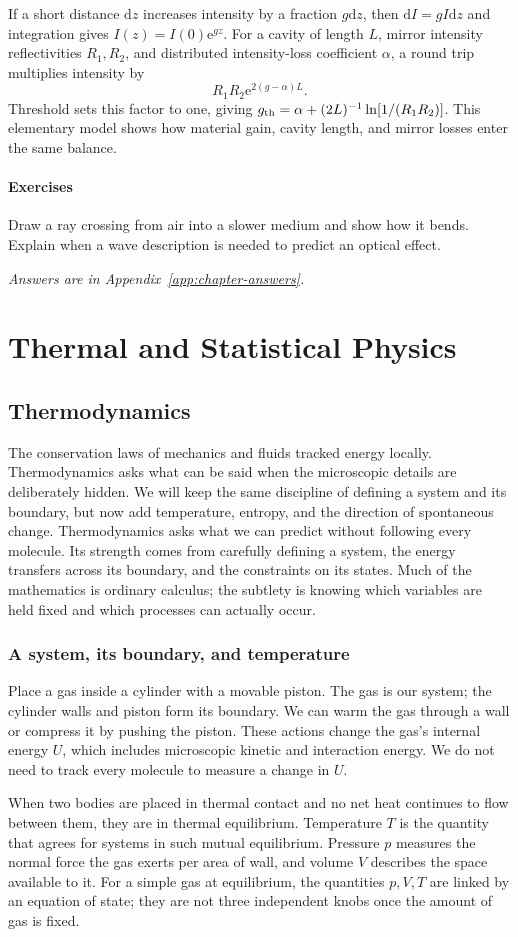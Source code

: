 \documentclass[11pt,oneside]{book}
\newcommand{\dd}{\mathrm{d}}
\newcommand{\ee}{\mathrm{e}}
\theoremstyle{reviewstyle}
\newcommand{\learningcheck}[1]{\subsection*{Exercises}\noindent #1\par\smallskip\noindent\emph{Answers are in Appendix~\ref{app:chapter-answers}.}}
\begin{document}
If a short distance $\dd z$ increases intensity by a fraction $g\dd z$, then $\dd I=gI\dd z$ and integration gives $I(z)=I(0)\ee^{gz}$. For a cavity of length $L$, mirror intensity reflectivities $R_1,R_2$, and distributed intensity-loss coefficient $\alpha$, a round trip multiplies intensity by
\begin{equation}
R_1R_2\ee^{2(g-\alpha)L}.
\end{equation}
Threshold sets this factor to one, giving $g_{\rm th}=\alpha+(2L)^{-1}\ln[1/(R_1R_2)]$. This elementary model shows how material gain, cavity length, and mirror losses enter the same balance.

\learningcheck{Draw a ray crossing from air into a slower medium and show how it bends. Explain when a wave description is needed to predict an optical effect.}

\part{Thermal and Statistical Physics}
\chapter{Thermodynamics}
The conservation laws of mechanics and fluids tracked energy locally. Thermodynamics asks what can be said when the microscopic details are deliberately hidden. We will keep the same discipline of defining a system and its boundary, but now add temperature, entropy, and the direction of spontaneous change.
Thermodynamics asks what we can predict without following every molecule. Its strength comes from carefully defining a system, the energy transfers across its boundary, and the constraints on its states. Much of the mathematics is ordinary calculus; the subtlety is knowing which variables are held fixed and which processes can actually occur.

\section{A system, its boundary, and temperature}
Place a gas inside a cylinder with a movable piston. The gas is our system; the cylinder walls and piston form its boundary. We can warm the gas through a wall or compress it by pushing the piston. These actions change the gas's internal energy $U$, which includes microscopic kinetic and interaction energy. We do not need to track every molecule to measure a change in $U$.

When two bodies are placed in thermal contact and no net heat continues to flow between them, they are in thermal equilibrium. Temperature $T$ is the quantity that agrees for systems in such mutual equilibrium. Pressure $p$ measures the normal force the gas exerts per area of wall, and volume $V$ describes the space available to it. For a simple gas at equilibrium, the quantities $p,V,T$ are linked by an equation of state; they are not three independent knobs once the amount of gas is fixed.
\end{document}
